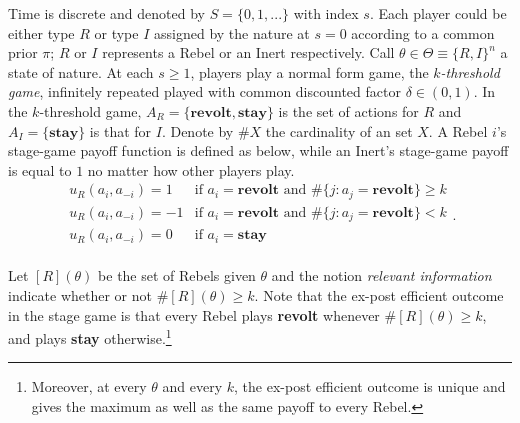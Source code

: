 \documentclass[12pt,letter]{article}
\theoremstyle{definition}
\theoremstyle{remark}
\theoremstyle{claim}
\begin{document}
Time is discrete and denoted by $S=\{0,1,...\}$ with index $s$. Each player could be either type $R$ or type $I$ assigned by the nature at $s=0$ according to a common prior $\pi$; $R$ or $I$ represents a Rebel or an Inert respectively. Call $\theta\in \Theta\equiv \{R,I\}^n$ a state of nature. At each $s\geq 1$, players play a normal form game, the \textit{$k$-threshold game}, infinitely repeated played with common discounted factor $\delta\in (0,1)$. In the $k$-threshold game, $A_R=\{\textbf{revolt}, \textbf{stay}\}$ is the set of actions for $R$ and $A_I=\{\textbf{stay}\}$ is that for $I$. Denote by $\#X$ the cardinality of an set $X$. A Rebel $i$'s stage-game payoff function is defined as below, while an Inert's stage-game payoff is equal to $1$ no matter how other players play. 
\[   
\begin{array}{ll}
      u_{R}(a_{i},a_{-i})=1 & \text{if $a_{i}=\textbf{revolt}$ and $\#\{j:a_{j}=\textbf{revolt}\}\geq k$} \\
      u_{R}(a_{i},a_{-i})=-1 & \text{if $a_{i}=\textbf{revolt}$ and $\#\{j:a_{j}=\textbf{revolt}\}< k$} \\
      u_{R}(a_{i},a_{-i})=0 & \text{if $a_{i}=\textbf{stay}$} \\
\end{array} 
. \]



Let $[R](\theta)$ be the set of Rebels given $\theta$ and the notion \textit{relevant information} indicate whether or not $\#[R](\theta)\geq k$. Note that the ex-post efficient outcome in the stage game is that every Rebel plays \textbf{revolt} whenever $\#[R](\theta)\geq k$, and plays \textbf{stay} otherwise.\footnote{Moreover, at every $\theta$ and every $k$, the ex-post efficient outcome is unique and gives the maximum as well as the same payoff to every Rebel.} 
\end{document}
